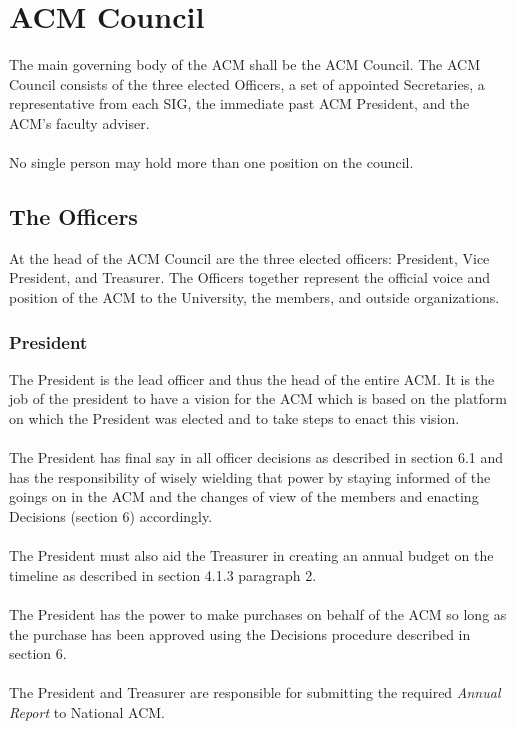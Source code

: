 \documentclass[12pt,titlepage]{article}
\begin{document}
\section{ACM Council}

The main governing body of the ACM shall be the ACM Council. The ACM Council consists of the three elected Officers, a set of appointed Secretaries, a representative from each SIG, the immediate past ACM President, and the ACM's faculty adviser.\\
\\
No single person may hold more than one position on the council.\\

\subsection{The Officers}

At the head of the ACM Council are the three elected officers: President, Vice President, and Treasurer. The Officers together represent the official voice and position of the ACM to the University, the members, and outside organizations.

\subsubsection{President}

The President is the lead officer and thus the head of the entire ACM. It is the job of the president to have a vision for the ACM which is based on the platform on which the President was elected and to take steps to enact this vision.\\
\\
The President has final say in all officer decisions as described in section 6.1 and has the responsibility of wisely wielding that power by staying informed of the goings on in the ACM and the changes of view of the members and enacting Decisions (section 6) accordingly.\\
\\
The President must also aid the Treasurer in creating an annual budget on the timeline as described in section 4.1.3 paragraph 2.\\
\\
The President has the power to make purchases on behalf of the ACM so long as the purchase has been approved using the Decisions procedure described in section 6.\\
\\
The President and Treasurer are responsible for submitting the required \emph{Annual Report} to National ACM.
\end{document}
